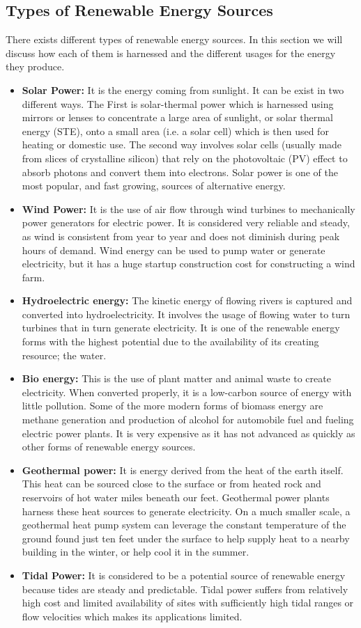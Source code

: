 \subsection{Types of Renewable Energy Sources}
There exists different types of renewable energy sources. In this section we will discuss how each of them is harnessed and the different usages for the energy they produce.
\begin{itemize}
	\item \textbf{Solar Power:} It is the energy coming from sunlight. It can be exist in two different ways. The First is solar-thermal power which is harnessed using mirrors or lenses to concentrate a large area of sunlight, or solar thermal energy (STE), onto a small area (i.e. a solar cell) which is then used for heating or domestic use. The second way involves solar cells (usually made from slices of crystalline silicon) that rely on the photovoltaic (PV) effect to absorb photons and convert them into electrons. Solar power is one of the most popular, and fast growing, sources of alternative energy.
	\item \textbf{Wind Power:} It is the use of air flow through wind turbines to mechanically power generators for electric power. It is considered very reliable and steady, as wind is consistent from year to year and does not diminish during peak hours of demand. Wind energy can be used to pump water or generate electricity, but it has a huge startup construction cost for constructing a wind farm.
	\item \textbf{Hydroelectric energy:} The kinetic energy of flowing rivers is captured and converted into hydroelectricity. It involves the usage of flowing water to turn turbines that in turn generate electricity. It is one of the renewable energy forms with the highest potential due to the availability of its creating resource; the water.
	\item \textbf{Bio energy:} This is the use of plant matter and animal waste to create electricity. When converted properly, it is a low-carbon source of energy with little pollution. Some of the more modern forms of biomass energy are methane generation and production of alcohol for automobile fuel and fueling electric power plants. It is very expensive as it has not advanced as quickly as other forms of renewable energy sources.
	\item \textbf{Geothermal power:} It is energy derived from the heat of the earth itself. This heat can be sourced close to the surface or from heated rock and reservoirs of hot water miles beneath our feet. Geothermal power plants harness these heat sources to generate electricity. On a much smaller scale, a geothermal heat pump system can leverage the constant temperature of the ground found just ten feet under the surface to help supply heat to a nearby building in the winter, or help cool it in the summer.
	\item \textbf{Tidal Power:} It is considered to be a potential source of renewable energy because tides are steady and predictable. Tidal power suffers from relatively high cost and limited availability of sites with sufficiently high tidal ranges or flow velocities which makes its applications limited.
\end{itemize}
